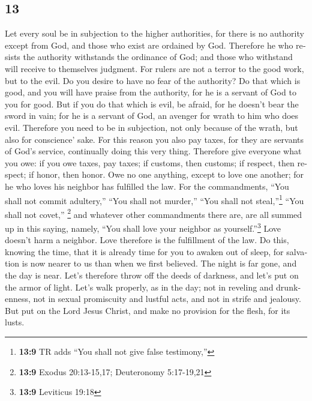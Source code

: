\begin{paracol}{2}
\switchcolumn
\begin{otherlanguage}{english}

\hypertarget{section-25}{%
\section{13}\label{section-25}}

 Let every soul be in subjection to the higher
authorities, for there is no authority except from God, and those who
exist are ordained by God.  Therefore he who resists the
authority withstands the ordinance of God; and those who withstand will
receive to themselves judgment.  For rulers are not a
terror to the good work, but to the evil. Do you desire to have no fear
of the authority? Do that which is good, and you will have praise from
the authority,  for he is a servant of God to you for
good. But if you do that which is evil, be afraid, for he doesn't bear
the sword in vain; for he is a servant of God, an avenger for wrath to
him who does evil.  Therefore you need to be in
subjection, not only because of the wrath, but also for conscience'
sake.  For this reason you also pay taxes, for they are
servants of God's service, continually doing this very thing.
 Therefore give everyone what you owe: if you owe taxes,
pay taxes; if customs, then customs; if respect, then respect; if honor,
then honor.  Owe no one anything, except to love one
another; for he who loves his neighbor has fulfilled the law.
 For the commandments, ``You shall not commit adultery,''
``You shall not murder,'' ``You shall not steal,''\footnote{\textbf{13:9}
  TR adds ``You shall not give false testimony,''} ``You shall not
covet,'' \footnote{\textbf{13:9} Exodus 20:13-15,17; Deuteronomy
  5:17-19,21} and whatever other commandments there are, are all summed
up in this saying, namely, ``You shall love your neighbor as
yourself.''\footnote{\textbf{13:9} Leviticus 19:18}  Love
doesn't harm a neighbor. Love therefore is the fulfillment of the law.
 Do this, knowing the time, that it is already time for
you to awaken out of sleep, for salvation is now nearer to us than when
we first believed.  The night is far gone, and the day is
near. Let's therefore throw off the deeds of darkness, and let's put on
the armor of light.  Let's walk properly, as in the day;
not in reveling and drunkenness, not in sexual promiscuity and lustful
acts, and not in strife and jealousy.  But put on the
Lord Jesus Christ, and make no provision for the flesh, for its lusts.


\end{otherlanguage}
\end{paracol}
